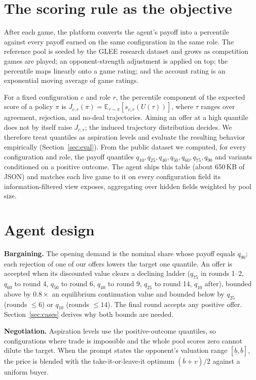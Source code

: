 \documentclass{article}
\begin{document}
\section{The scoring rule as the objective}
\label{sec:scoring}

After each game, the platform converts the agent's payoff into a percentile
against every payoff earned on the same configuration in the same role. The
reference pool is seeded by the GLEE research dataset and grows as competition
games are played; an opponent-strength adjustment is applied on top; the
percentile maps linearly onto a game rating; and the account rating is an
exponential moving average of game ratings.

For a fixed configuration $c$ and role $r$, the percentile component of the
expected score of a policy $\pi$ is $J_{c,r}(\pi) = \mathbb{E}_{\tau\sim\pi}
[s_{c,r}(U(\tau))]$, where $\tau$ ranges over agreement, rejection, and
no-deal trajectories. Aiming an offer at a high quantile does not by itself
raise $J_{c,r}$; the induced trajectory distribution decides. We therefore
treat quantiles as aspiration levels and evaluate the resulting behavior
empirically (Section~\ref{sec:eval}). From the public dataset we computed, for
every configuration and role, the payoff quantiles
$q_{10},q_{25},q_{40},q_{50},q_{60},q_{75},q_{90}$ and variants conditioned on
a positive outcome. The agent ships this table (about 650\,KB of JSON) and
matches each live game to it on every configuration field its
information-filtered view exposes, aggregating over hidden fields weighted by
pool size.

\section{Agent design}
\label{sec:design}

\textbf{Bargaining.} The opening demand is the nominal share whose payoff
equals $q_{90}$; each rejection of one of our offers lowers the target one
quantile. An offer is accepted when its discounted value clears a declining
ladder ($q_{75}$ in rounds 1--2, $q_{60}$ to round 4, $q_{50}$ to round 6,
$q_{40}$ to round 9, $q_{25}$ to round 14, $q_{10}$ after), bounded above by
$0.8\times$ an equilibrium continuation value and bounded below by $q_{25}$
(rounds $\le 6$) or $q_{10}$ (rounds $\le 14$). The final round accepts any
positive offer. Section~\ref{sec:cases} derives why both bounds are needed.

\textbf{Negotiation.} Aspiration levels use the positive-outcome quantiles,
so configurations where trade is impossible and the whole pool scores zero
cannot dilute the target. When the prompt states the opponent's valuation
range $[\underline{b},\overline{b}]$, the price is blended with the
take-it-or-leave-it optimum $(\overline{b}+v)/2$ against a uniform buyer.
\end{document}
